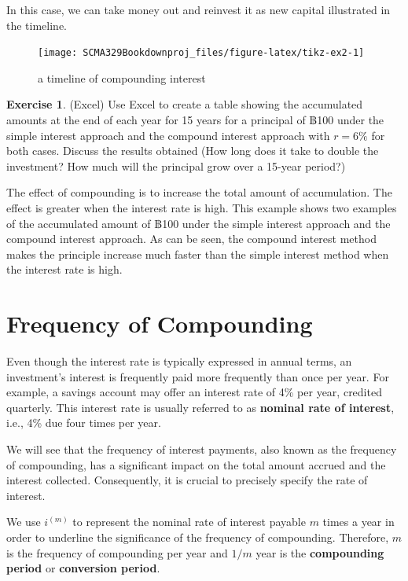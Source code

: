\documentclass[
]{book}
\theoremstyle{definition}
\theoremstyle{definition}
\theoremstyle{definition}
\newtheorem{exercise}{Exercise}[chapter]
\theoremstyle{definition}
\theoremstyle{remark}
\begin{document}
\theNote In this case, we can take money out and reinvest it as new capital illustrated in the timeline.

\begin{figure}

{\centering \texttt{[image: SCMA329Bookdownproj\_files/figure-latex/tikz-ex2-1]} 

}

\caption{a timeline of compounding interest}\label{fig:tikz-ex2}
\end{figure}

\begin{exercise}
(Excel) Use Excel to create a table showing the accumulated amounts at the end of each year for 15 years for a principal of ฿100 under the simple interest approach and the compound interest approach with \(r = 6\%\) for both cases.
Discuss the results obtained (How long does it take to double the investment? How much will the principal grow over a 15-year period?)
\end{exercise}

The effect of compounding is to increase the total amount of accumulation. The effect is greater when the interest rate is high. This example shows two examples of the accumulated amount of ฿100 under the simple interest approach and the compound interest approach. As can be seen, the compound interest method makes the principle increase much faster than the simple interest method when the interest rate is high.

\hypertarget{frequency-of-compounding}{%
\section{Frequency of Compounding}\label{frequency-of-compounding}}

Even though the interest rate is typically expressed in annual terms, an investment's interest is frequently paid more frequently than once per year. For example, a savings account may offer an interest rate of 4\% per year, credited quarterly. This interest rate is usually referred to as \textbf{nominal rate of interest}, i.e., 4\% due four times per year.

We will see that the frequency of interest payments, also known as the frequency of compounding, has a significant impact on the total amount accrued and the interest collected. Consequently, it is crucial to precisely specify the rate of interest.

We use \(i^{(m)}\) to represent the nominal rate of interest payable \(m\) times a year in order to underline the significance of the frequency of compounding. Therefore, \(m\) is the
frequency of compounding per year and \(1/m\) year is the \textbf{compounding period} or \textbf{conversion period}.
\end{document}

